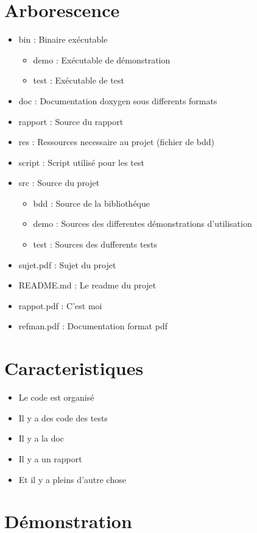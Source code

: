 \documentclass[a4paper]{article}
\begin{document}
\section{Arborescence}

\begin{itemize}
\item bin : Binaire exécutable
\begin{itemize}
  \item demo : Exécutable de démonstration
  \item test : Exécutable de test
\end{itemize}
\item doc : Documentation doxygen sous differents formats
\item rapport : Source du rapport
\item res : Ressources necessaire au projet (fichier de bdd)
\item script  : Script utilisé pour les test
\item src : Source du projet
\begin{itemize}
  \item bdd   : Source de la bibliothéque
  \item demo  : Sources des differentes démonstrations d'utilisation
  \item test  : Sources des dufferents tests
\end{itemize}

\item sujet.pdf  : Sujet du projet
\item README.md  : Le readme du projet
\item rappot.pdf : C'est moi
\item refman.pdf : Documentation format pdf
\end{itemize}

\section{Caracteristiques}

\begin{itemize}
	\item Le code est organisé
	\item Il y a des code des tests
	\item Il y a la doc
	\item Il y a un rapport
	\item Et il y a pleins d'autre chose
\end{itemize}

\section{Démonstration}
\end{document}
